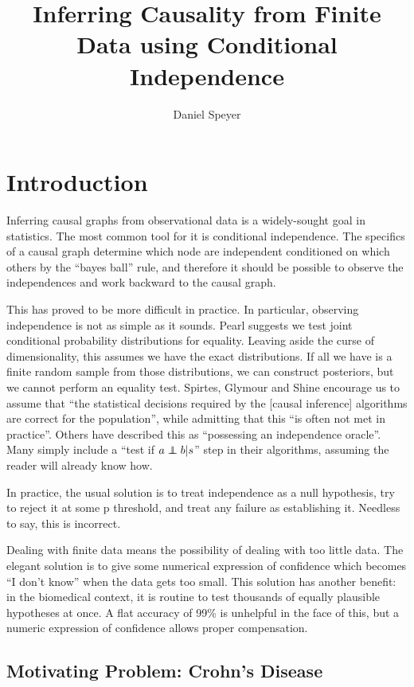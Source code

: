 \documentclass[twocolumn,12pt]{article}
\title{Inferring Causality from Finite Data using Conditional Independence}
\author{Daniel Speyer}
\newcommand\indep{\protect\mathpalette{\protect\independenT}{\perp}}
\def\independenT#1#2{\mathrel{\rlap{$#1#2$}\mkern2mu{#1#2}}}
\begin{document}
\maketitle

\section{Introduction}

Inferring causal graphs from observational data is a widely-sought
goal in statistics.  The most common tool for it is conditional
independence.  The specifics of a causal graph determine which node
are independent conditioned on which others by the ``bayes ball''
rule, and therefore it should be possible to observe the independences
and work backward to the causal graph.

This has proved to be more difficult in practice.  In particular,
observing independence is not as simple as it sounds.  Pearl suggests
we test joint conditional probability distributions for equality\cite{Pearl}.
Leaving aside the curse of dimensionality, this assumes we have the
exact distributions.  If all we have is a finite random sample from
those distributions, we can construct posteriors, but we cannot perform
an equality test.  Spirtes, Glymour and Shine  encourage us to assume that
``the statistical decisions required by the [causal inference]
algorithms are correct
for the population'', while admitting that this ``is often not met in
practice''\cite{Spirtes}.  Others have described this as ``possessing an
independence oracle''\cite{Peters,pcalg}.  Many simply include a ``test if $a\indep
b|s$'' step in their algorithms, assuming the reader will already know
how.

In practice, the usual solution is to treat independence as a null
hypothesis, try to reject it at some p threshold, and treat any
failure as establishing it.  Needless to say, this is incorrect.

Dealing with finite data means the possibility of dealing with too
little data.  The elegant solution is to give some numerical
expression of confidence which becomes ``I don't know'' when the data
gets too small.  This solution has another benefit: in the biomedical
context, it is routine to test thousands of equally plausible
hypotheses at once.  A flat accuracy of 99\% is unhelpful in the face
of this, but a numeric expression of confidence allows proper
compensation.

\subsection{Motivating Problem: Crohn's Disease}
\end{document}
